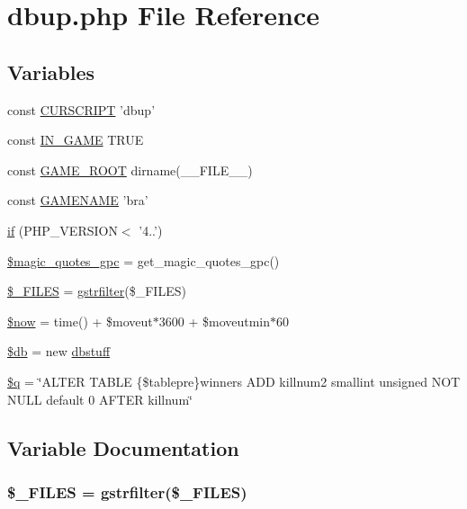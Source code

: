 \hypertarget{dbup_8php}{\section{dbup.\+php File Reference}
\label{dbup_8php}
}
\subsection*{Variables}
\begin{DoxyCompactItemize}
\item 
const \hyperlink{dbup_8php_a39c39f525eceb86cabc338804f230e80}{C\+U\+R\+S\+C\+R\+I\+P\+T} 'dbup'
\item 
const \hyperlink{dbup_8php_a12c82f3d28569a3f80804f1e72cef14c}{I\+N\+\_\+\+G\+A\+M\+E} T\+R\+U\+E
\item 
const \hyperlink{dbup_8php_a8e43cd27c8e744fff590983bc396aba3}{G\+A\+M\+E\+\_\+\+R\+O\+O\+T} dirname(\+\_\+\+\_\+\+F\+I\+L\+E\+\_\+\+\_\+)
\item 
const \hyperlink{dbup_8php_a3cd7223880b2f6a1d0bcb325ce43c606}{G\+A\+M\+E\+N\+A\+M\+E} 'bra'
\item 
\hyperlink{dbup_8php_a4ac1118c2e44c513a674bc1793ba6c90}{if} (P\+H\+P\+\_\+\+V\+E\+R\+S\+I\+O\+N$<$  '4..')
\item 
\hyperlink{dbup_8php_a3bf6a6f8faa278d5cceb69655ecdb782}{\$magic\+\_\+quotes\+\_\+gpc} = get\+\_\+magic\+\_\+quotes\+\_\+gpc()
\item 
\hyperlink{dbup_8php_a797c40bb61689e5072487a9a8d66843c}{\$\+\_\+\+F\+I\+L\+E\+S} = \hyperlink{global_8func_8php_a2b7ece9137321f3300ce816cab600087}{gstrfilter}(\$\+\_\+\+F\+I\+L\+E\+S)
\item 
\hyperlink{dbup_8php_af1d5ccdee975b8f4d20aaffc5b28557c}{\$now} = time() + \$moveut$\ast$3600 + \$moveutmin$\ast$60
\item 
\hyperlink{dbup_8php_a1fa3127fc82f96b1436d871ef02be319}{\$db} = new \hyperlink{classdbstuff}{dbstuff}
\item 
\hyperlink{dbup_8php_abb0f8f809252372e25f48d52b63ef29d}{\$q} = \char`\"{}A\+L\+T\+E\+R T\+A\+B\+L\+E \{\$tablepre\}winners A\+D\+D killnum2 smallint unsigned N\+O\+T N\+U\+L\+L default 0 A\+F\+T\+E\+R killnum\char`\"{}
\end{DoxyCompactItemize}


\subsection{Variable Documentation}
\hypertarget{dbup_8php_a797c40bb61689e5072487a9a8d66843c}{
\subsubsection[{\$\+\_\+\+F\+I\+L\+E\+S}]{\setlength{\rightskip}{0pt plus 5cm}\$\+\_\+\+F\+I\+L\+E\+S = {\bf gstrfilter}(\$\+\_\+\+F\+I\+L\+E\+S)}}\label{dbup_8php_a797c40bb61689e5072487a9a8d66843c}



